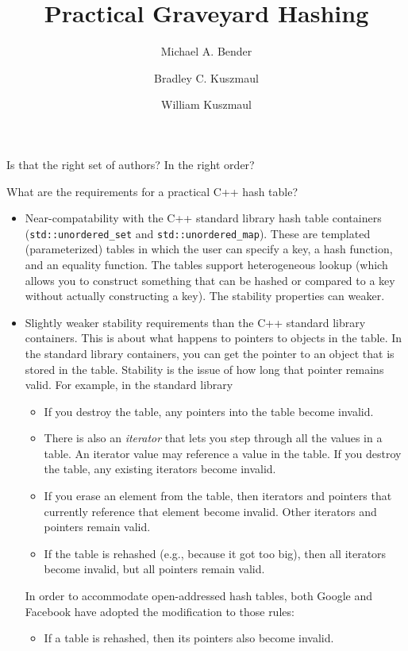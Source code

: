 \documentclass{article}
\title{Practical Graveyard Hashing}
\author{Michael A. Bender \and
        Bradley C. Kuszmaul \and
        William Kuszmaul}
\begin{document}
\maketitle

Is that the right set of authors?  In the right order?

What are the requirements for a practical C++ hash table?
\begin{itemize}
\item Near-compatability with the C++ standard library hash table
  containers (\texttt{std::unordered\_set} and
  \texttt{std::unordered\_map}).  These are templated (parameterized)
  tables in which the user can specify a key, a hash function, and an
  equality function.  The tables support heterogeneous lookup (which
  allows you to construct something that can be hashed or compared to
  a key without actually constructing a key).  The stability
  properties can weaker.
    
\item Slightly weaker stability requirements than the C++ standard library containers.  This is about what happens to pointers to objects in the table.  In the standard library containers, you can get the pointer to an object that is stored in the table. Stability is the issue of how long that pointer remains valid.  For example, in the standard library
  \begin{itemize}
    \item If you destroy the table, any pointers into the table become invalid.
    \item There is also an \textit{iterator} that lets you step
      through all the values in a table.  An iterator value may
      reference a value in the table.  If you destroy the table, any
      existing iterators become invalid.
    \item If you erase an element from the table, then iterators and
      pointers that currently reference that element become invalid.
      Other iterators and pointers remain valid.
    \item If the table is rehashed (e.g., because it got too big),
      then all iterators become invalid, but all pointers remain valid.
   \end{itemize}

  In order to accommodate open-addressed hash tables, both Google and
  Facebook have adopted the modification to those rules:
  \begin{itemize}
  \item  If a table is rehashed, then its pointers also become invalid.
  \end{itemize}


\end{itemize}
\end{document}
